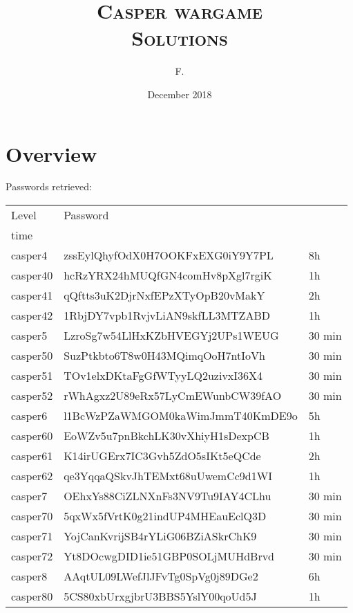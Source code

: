 \documentclass[a4paper,12pt]{article}
\title{\scshape Casper wargame \\ Solutions}
\author{F.\\}
\date{December 2018}
\begin{document}
\maketitle

\tableofcontents

\newpage
\section{Overview}
Passwords retrieved:
\begin{table}[H]
\centering
\begin{tabularx}{\linewidth} {l|l|l}
 Level & Password  &  \begin{tabular}{@{}c@{}}Approximate \\ time\end{tabular} \\
 \hline
 casper4 & zssEylQhyfOdX0H7OOKFxEXG0iY9Y7PL &  8h \\
 casper40 & hcRzYRX24hMUQfGN4comHv8pXgl7rgiK & 1h \\
 casper41 & qQftts3uK2DjrNxfEPzXTyOpB20vMakY & 2h \\
 casper42 & 1RbjDY7vpb1RvjvLiAN9skfLL3MTZABD & 1h \\
 \hline
 casper5 & LzroSg7w54LlHxKZbHVEGYj2UPs1WEUG & 30 min \\
 casper50 & SuzPtkbto6T8w0H43MQimqOoH7ntIoVh & 30 min\\
 casper51 & TOv1elxDKtaFgGfWTyyLQ2uzivxI36X4 & 30 min\\
 casper52 & rWhAgxz2U89eRx57LyCmEWunbCW39fAO & 30 min\\
 \hline
 casper6 & l1BcWzPZaWMGOM0kaWimJmmT40KmDE9o & 5h \\ 
 casper60 & EoWZv5u7pnBkchLK30vXhiyH1sDexpCB & 1h\\
 casper61 & K14irUGErx7IC3Gvh5ZdO5sIKt5eQCde & 2h \\ 
 casper62 & qe3YqqaQSkvJhTEMxt68uUwemCc9d1WI & 1h \\ 
 \hline
 casper7 & OEhxYs88CiZLNXnFs3NV9Tu9IAY4CLhu & 30 min\\ 
 casper70 & 5qxWx5fVrtK0g21indUP4MHEauEclQ3D & 30 min \\
 casper71 & YojCanKvrijSB4rYLiG06BZiASkrChK9 & 30 min\\              casper72 & Yt8DOcwgDID1ie51GBP0SOLjMUHdBrvd &  30 min\\
 \hline
 casper8 & AAqtUL09LWefJlJFvTg0SpVg0j89DGe2 & 6h \\ 
 casper80 & 5CS80xbUrxgjbrU3BBS5YslY00qoUd5J &  1h \\

\end{tabularx}
\end{table}
\end{document}
